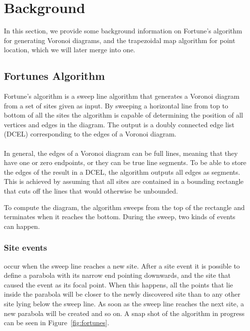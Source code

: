 \section{Background}
\label{background}

In this section, we provide some background information on Fortune's algorithm for generating Voronoi diagrams, and the trapezoidal map algorithm for point location, which we will later merge into one.

\subsection{Fortunes Algorithm}
Fortune’s algorithm is a sweep line algorithm that generates a Voronoi diagram from a set of sites given as input. By sweeping a horizontal line from top to bottom of all the sites the algorithm is capable of determining the position of all vertices and edges in the diagram. The output is a doubly connected edge list (DCEL) corresponding to the edges of a Voronoi diagram.

\paragraph{}
In general, the edges of a Voronoi diagram can be full lines, meaning that they have one or zero endpoints, or they can be true line segments. To be able to store the edges of the result in a DCEL, the algorithm outputs all edges as segments. This is achieved by assuming that all sites are contained in a bounding rectangle that cuts off the lines that would otherwise be unbounded.

To compute the diagram, the algorithm sweeps from the top of the rectangle and terminates when it reaches the bottom. During the sweep, two kinds of events can happen. 

\subsubsection{Site events}
occur when the sweep line reaches a new site. After a site event it is possible to define a parabola with its narrow end pointing downwards, and the site that caused the event as its focal point. When this happens, all the points that lie inside the parabola will be closer to the newly discovered site than to any other site lying below the sweep line. As soon as the sweep line reaches the next site, a new parabola will be created and so on. A snap shot of the algorithm in progress can be seen in Figure~\ref{fig:fortunes}.

